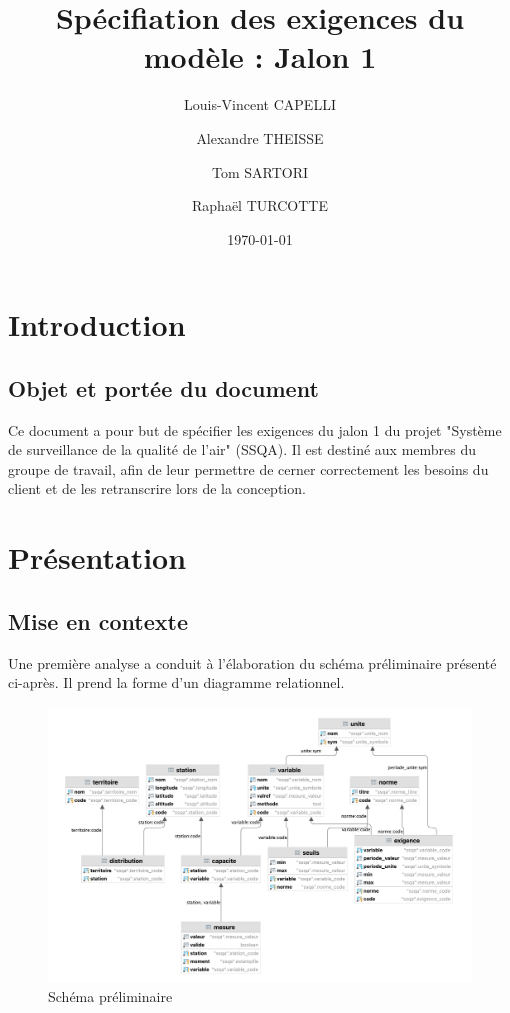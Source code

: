 \documentclass{article}
\begin{document}
\title{Spécifiation des exigences du modèle : Jalon 1}

\author{Louis-Vincent CAPELLI \and Alexandre THEISSE \and Tom SARTORI \and Raphaël TURCOTTE}
\date{\today}
\maketitle
\newpage

\tableofcontents
\newpage

\section{Introduction}
\subsection*{Objet et portée du document}
Ce document a pour but de spécifier les exigences du jalon 1 du projet "Système
de surveillance de la qualité de l'air" (SSQA). Il est destiné aux membres du 
groupe de travail, afin de leur permettre de cerner correctement les besoins
du client et de les retranscrire lors de la conception.

\section{Présentation}
\subsection{Mise en contexte}
Une première analyse a conduit à l'élaboration du schéma préliminaire présenté ci-après.
Il prend la forme d'un diagramme relationnel.

\begin{figure}[h]
\centering
\includegraphics[scale=0.4]{preli.png}
\caption{Schéma préliminaire}
\end{figure}
\end{document}
